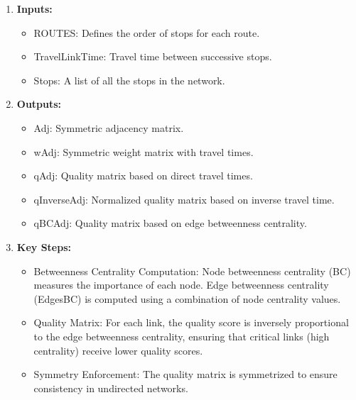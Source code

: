 \documentclass[
  letterpaper,
  DIV=11,
  numbers=noendperiod]{scrartcl}
\providecommand{\tightlist}{%
  \setlength{\itemsep}{0pt}\setlength{\parskip}{0pt}}\usepackage{longtable,booktabs,array}
\begin{document}
\begin{enumerate}
\def\labelenumi{\arabic{enumi}.}
\tightlist
\item
  \textbf{Inputs:}

  \begin{itemize}
  \tightlist
  \item
    ROUTES: Defines the order of stops for each route.
  \item
    TravelLinkTime: Travel time between successive stops.
  \item
    Stops: A list of all the stops in the network.
  \end{itemize}
\item
  \textbf{Outputs:}

  \begin{itemize}
  \tightlist
  \item
    Adj: Symmetric adjacency matrix.
  \item
    wAdj: Symmetric weight matrix with travel times.
  \item
    qAdj: Quality matrix based on direct travel times.
  \item
    qInverseAdj: Normalized quality matrix based on inverse travel time.
  \item
    qBCAdj: Quality matrix based on edge betweenness centrality.
  \end{itemize}
\item
  \textbf{Key Steps:}

  \begin{itemize}
  \tightlist
  \item
    Betweenness Centrality Computation: Node betweenness centrality (BC)
    measures the importance of each node. Edge betweenness centrality
    (EdgesBC) is computed using a combination of node centrality values.
  \item
    Quality Matrix: For each link, the quality score is inversely
    proportional to the edge betweenness centrality, ensuring that
    critical links (high centrality) receive lower quality scores.
  \item
    Symmetry Enforcement: The quality matrix is symmetrized to ensure
    consistency in undirected networks.
  \end{itemize}
\end{enumerate}
\end{document}
